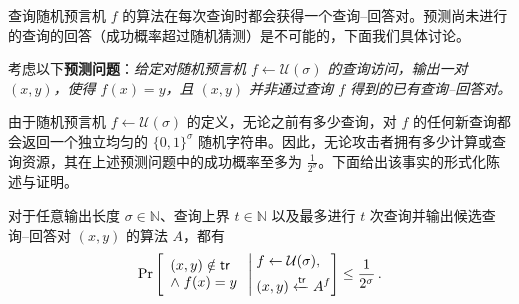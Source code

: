 \documentclass[american,singlepageview]{snargs-book-zh}
\renewcommand{\enspace}{\ensuremath{\thinspace}}
\newcommand{\Bits}{\{0,1\}}
\newcommand{\Naturals}{\mathbb{N}}
\newcommand{\ProtoAdversary}{A}
\newcommand{\ROFunction}{f}
\newcommand{\ROQueryBound}{t}
\newcommand{\RODistribution}[1]{\mathcal{U}(#1)}
\newcommand{\ROOutputAndTrace}[4]{#4 \xleftarrow{#3} {#2}^{#1}}
\newcommand{\ROQuery}{x}
\newcommand{\ROAnswer}{y}
\newcommand{\ROTrace}{\mathsf{tr}}
\newcommand{\ROAdversary}{\ProtoAdversary}
\newcommand{\ROOutputSize}{\sigma}
\newcommand{\ROPExpression}[1]{\frac{1}{2^{#1}}}
\begin{document}
查询随机预言机 $\ROFunction$ 的算法在每次查询时都会获得一个查询–回答对。预测尚未进行的查询的回答（成功概率超过随机猜测）是不可能的，下面我们具体讨论。

考虑以下\textbf{预测问题}：\emph{给定对随机预言机 $\ROFunction \gets \RODistribution{\ROOutputSize}$ 的查询访问，输出一对 $(\ROQuery,\ROAnswer)$，使得 $\ROFunction(\ROQuery)=\ROAnswer$，且 $(\ROQuery,\ROAnswer)$ 并非通过查询 $\ROFunction$ 得到的已有查询–回答对。}

由于随机预言机 $\ROFunction\gets\RODistribution{\ROOutputSize}$ 的定义，无论之前有多少查询，对 $\ROFunction$ 的任何新查询都会返回一个独立均匀的 $\Bits^{\ROOutputSize}$ 随机字符串。因此，无论攻击者拥有多少计算或查询资源，其在上述预测问题中的成功概率至多为 $\ROPExpression{\ROOutputSize}$。下面给出该事实的形式化陈述与证明。

\begin{lemma}
\label{lemma:rom-not-queried-pair}
对于任意输出长度 $\ROOutputSize\in\Naturals$、查询上界 $\ROQueryBound\in\Naturals$ 以及最多进行 $\ROQueryBound$ 次查询并输出候选查询–回答对 $(\ROQuery,\ROAnswer)$ 的算法 $\ROAdversary$，都有
\begin{equation*}
\Pr\left[
\begin{array}{l}
(\ROQuery,\ROAnswer)\notin\ROTrace\\
\land\;\ROFunction(\ROQuery)=\ROAnswer
\end{array}
\;\Bigg|\;
\begin{aligned}
&\ROFunction\gets\RODistribution{\ROOutputSize},\\
&\ROOutputAndTrace{\ROFunction}{\ROAdversary}{\ROTrace}{(\ROQuery,\ROAnswer)}
\end{aligned}
\right]
\le
\ROPExpression{\ROOutputSize}
\enspace.
\end{equation*}
\end{lemma}
\end{document}

